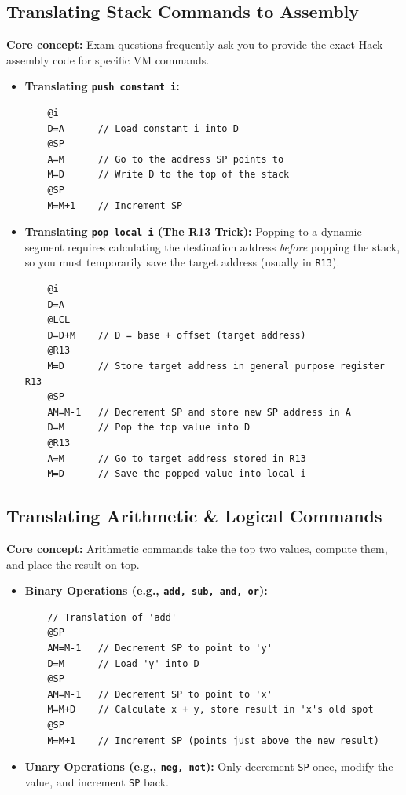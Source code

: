 \documentclass[12pt,a4paper]{article}
\begin{document}
\subsection{Translating Stack Commands to Assembly}
\textbf{Core concept:} Exam questions frequently ask you to provide the exact Hack assembly code for specific VM commands.
\begin{itemize}
    \item \textbf{Translating \texttt{push constant i}:}
    \begin{verbatim}
    @i
    D=A      // Load constant i into D
    @SP
    A=M      // Go to the address SP points to
    M=D      // Write D to the top of the stack
    @SP
    M=M+1    // Increment SP
    \end{verbatim}
    \item \textbf{Translating \texttt{pop local i} (The R13 Trick):} Popping to a dynamic segment requires calculating the destination address \textit{before} popping the stack, so you must temporarily save the target address (usually in \texttt{R13}).
    \begin{verbatim}
    @i
    D=A
    @LCL
    D=D+M    // D = base + offset (target address)
    @R13
    M=D      // Store target address in general purpose register R13
    @SP
    AM=M-1   // Decrement SP and store new SP address in A
    D=M      // Pop the top value into D
    @R13
    A=M      // Go to target address stored in R13
    M=D      // Save the popped value into local i
    \end{verbatim}
\end{itemize}

\subsection{Translating Arithmetic \& Logical Commands}
\textbf{Core concept:} Arithmetic commands take the top two values, compute them, and place the result on top.
\begin{itemize}
    \item \textbf{Binary Operations (e.g., \texttt{add, sub, and, or}):}
    \begin{verbatim}
    // Translation of 'add'
    @SP
    AM=M-1   // Decrement SP to point to 'y'
    D=M      // Load 'y' into D
    @SP
    AM=M-1   // Decrement SP to point to 'x'
    M=M+D    // Calculate x + y, store result in 'x's old spot
    @SP
    M=M+1    // Increment SP (points just above the new result)
    \end{verbatim}
    \item \textbf{Unary Operations (e.g., \texttt{neg, not}):} Only decrement \texttt{SP} once, modify the value, and increment \texttt{SP} back.
\end{itemize}
\end{document}
